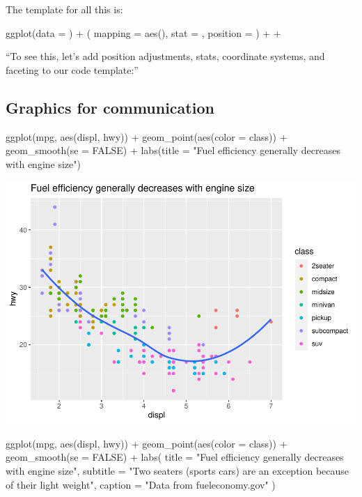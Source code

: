 \documentclass[
]{article}
\newenvironment{Shaded}{\begin{snugshade}}{\end{snugshade}}
\newcommand{\AttributeTok}[1]{\textcolor[rgb]{0.77,0.63,0.00}{#1}}
\newcommand{\ConstantTok}[1]{\textcolor[rgb]{0.00,0.00,0.00}{#1}}
\newcommand{\FunctionTok}[1]{\textcolor[rgb]{0.00,0.00,0.00}{#1}}
\newcommand{\NormalTok}[1]{#1}
\newcommand{\SpecialCharTok}[1]{\textcolor[rgb]{0.00,0.00,0.00}{#1}}
\newcommand{\StringTok}[1]{\textcolor[rgb]{0.31,0.60,0.02}{#1}}
\begin{document}
The template for all this is:

ggplot(data = ) + ( mapping = aes(), stat = , position = ) + +

``To see this, let's add position adjustments, stats, coordinate
systems, and faceting to our code template:''

\hypertarget{graphics-for-communication}{%
\subsection{Graphics for
communication}\label{graphics-for-communication}}

\begin{Shaded}
\begin{Highlighting}[]
\FunctionTok{ggplot}\NormalTok{(mpg, }\FunctionTok{aes}\NormalTok{(displ, hwy)) }\SpecialCharTok{+}
  \FunctionTok{geom\_point}\NormalTok{(}\FunctionTok{aes}\NormalTok{(}\AttributeTok{color =}\NormalTok{ class)) }\SpecialCharTok{+}
  \FunctionTok{geom\_smooth}\NormalTok{(}\AttributeTok{se =} \ConstantTok{FALSE}\NormalTok{) }\SpecialCharTok{+}
  \FunctionTok{labs}\NormalTok{(}\AttributeTok{title =} \StringTok{"Fuel efficiency generally decreases with engine size"}\NormalTok{)}
\end{Highlighting}
\end{Shaded}

\includegraphics{Journal_files/figure-latex/unnamed-chunk-57-1.pdf}

\begin{Shaded}
\begin{Highlighting}[]
\FunctionTok{ggplot}\NormalTok{(mpg, }\FunctionTok{aes}\NormalTok{(displ, hwy)) }\SpecialCharTok{+}
  \FunctionTok{geom\_point}\NormalTok{(}\FunctionTok{aes}\NormalTok{(}\AttributeTok{color =}\NormalTok{ class)) }\SpecialCharTok{+}
  \FunctionTok{geom\_smooth}\NormalTok{(}\AttributeTok{se =} \ConstantTok{FALSE}\NormalTok{) }\SpecialCharTok{+}
  \FunctionTok{labs}\NormalTok{(}
    \AttributeTok{title =} \StringTok{"Fuel efficiency generally decreases with engine size"}\NormalTok{,}
    \AttributeTok{subtitle =} \StringTok{"Two seaters (sports cars) are an exception because of their light weight"}\NormalTok{,}
    \AttributeTok{caption =} \StringTok{"Data from fueleconomy.gov"}
\NormalTok{  )}
\end{Highlighting}
\end{Shaded}
\end{document}
